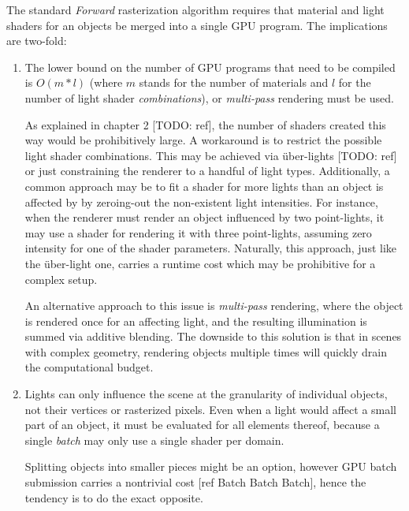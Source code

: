 The standard \emph{Forward} rasterization algorithm requires that material and light shaders for an objects be merged into a single GPU program. The implications are two-fold:
\begin{enumerate}
\item The lower bound on the number of GPU programs that need to be compiled is $O(m * l)$ (where $m$ stands for the number of materials and $l$ for the number of light shader \emph{combinations}), or \emph{multi-pass} rendering must be used.

As explained in chapter 2 [TODO: ref], the number of shaders created this way would be prohibitively large. A workaround is to restrict the possible light shader combinations. This may be achieved via über-lights [TODO: ref] or just constraining the renderer to a handful of light types. Additionally, a common approach may be to fit a shader for more lights than an object is affected by by zeroing-out the non-existent light intensities. For instance, when the renderer must render an object influenced by two point-lights, it may use a shader for rendering it with three point-lights, assuming zero intensity for one of the shader parameters. Naturally, this approach, just like the über-light one, carries a runtime cost which may be prohibitive for a complex setup.


An alternative approach to this issue is \emph{multi-pass} rendering, where the object is rendered once for an affecting light, and the resulting illumination is summed via additive blending. The downside to this solution is that in scenes with complex geometry, rendering objects multiple times will quickly drain the computational budget.

\item Lights can only influence the scene at the granularity of individual objects, not their vertices or rasterized pixels. Even when a light would affect a small part of an object, it must be evaluated for all elements thereof, because a single \emph{batch} may only use a single shader per domain.

Splitting objects into smaller pieces might be an option, however GPU batch submission carries a nontrivial cost [ref Batch Batch Batch], hence the tendency is to do the exact opposite.
\end{enumerate}

